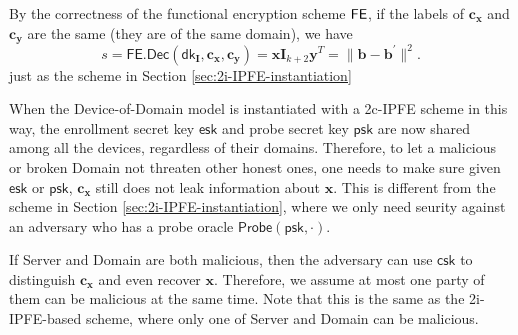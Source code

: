 By the correctness of the functional encryption scheme $\sf FE$, if the labels of $\mathbf{c_x}$ and $\mathbf{c_y}$ are the same (they are of the same domain), we have
\[
	s = \textsf{FE.Dec}(\textsf{dk}_{\mathbf{I}}, \mathbf{c_x}, \mathbf{c_y}) =  \mathbf{x} \mathbf{I}_{k+2} \mathbf{y}^T = \| \mathbf{b} - \mathbf{b}^\prime \|^2.
\]
just as the scheme in Section \ref{sec:2i-IPFE-instantiation}

When the Device-of-Domain model is instantiated with a 2c-IPFE scheme in this way, the enrollment secret key $\textsf{esk}$ and probe secret key $\textsf{psk}$ are now shared among all the devices, regardless of their domains. Therefore, to let a malicious or broken \textsf{Domain} not threaten other honest ones, one needs to make sure given $\textsf{esk}$ or $\textsf{psk}$, $\mathbf{c_x}$ still does not leak information about $\mathbf{x}$. This is different from the scheme in Section \ref{sec:2i-IPFE-instantiation}, where we only need seurity against an adversary who has a probe oracle $\textsf{Probe}(\textsf{psk}, \cdot)$.

If \textsf{Server} and \textsf{Domain} are both malicious, then the adversary can use $\textsf{csk}$ to distinguish $\mathbf{c_x}$ and even recover $\mathbf{x}$. Therefore, we assume at most one party of them can be malicious at the same time. Note that this is the same as the 2i-IPFE-based scheme, where only one of \textsf{Server} and \textsf{Domain} can be malicious.

\fi


